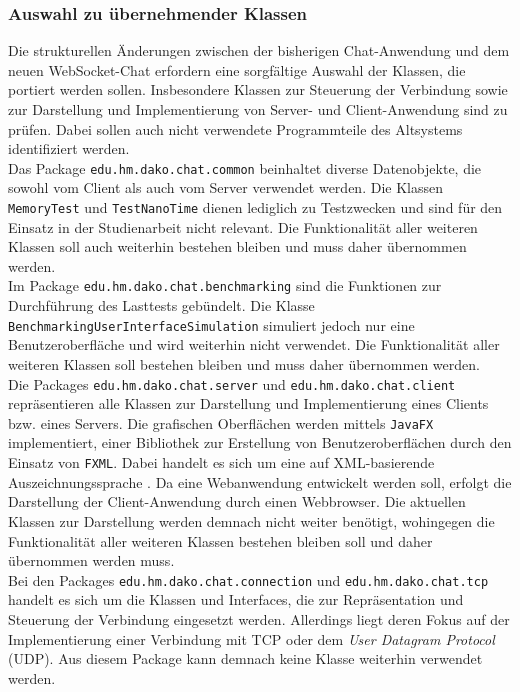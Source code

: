 \documentclass[11pt,a4paper,titlepage]{scrartcl}
\numberwithin{equation}{section}
\begin{document}
\subsubsection{Auswahl zu übernehmender Klassen }
Die strukturellen Änderungen zwischen der bisherigen Chat-Anwendung und dem neuen WebSocket-Chat erfordern eine sorgfältige Auswahl der Klassen, die portiert werden sollen. Insbesondere Klassen zur Steuerung der Verbindung sowie zur Darstellung und Implementierung von Server- und Client-Anwendung sind zu prüfen. Dabei sollen auch nicht verwendete Programmteile des Altsystems identifiziert werden.\\

\noindent Das Package \texttt{edu.hm.dako.chat.common} beinhaltet diverse Datenobjekte, die sowohl vom Client als auch vom Server verwendet werden. Die Klassen \texttt{MemoryTest} und \texttt{TestNanoTime} dienen lediglich zu Testzwecken und sind für den Einsatz in der Studienarbeit nicht relevant. Die Funktionalität aller weiteren Klassen soll auch weiterhin bestehen bleiben und muss daher übernommen werden. \\

\noindent Im Package \texttt{edu.hm.dako.chat.benchmarking} sind die Funktionen zur Durchführung des Lasttests gebündelt. Die Klasse \texttt{BenchmarkingUserInterfaceSimulation} simuliert jedoch nur eine Benutzeroberfläche und wird weiterhin nicht verwendet. Die Funktionalität aller weiteren Klassen soll bestehen bleiben und muss daher übernommen werden. \\

\noindent Die Packages \texttt{edu.hm.dako.chat.server} und \texttt{edu.hm.dako.chat.client} repräsentieren alle Klassen zur Darstellung und Implementierung eines Clients bzw. eines Servers. Die grafischen Oberflächen werden mittels \texttt{JavaFX} implementiert, einer Bibliothek zur Erstellung von Benutzeroberflächen durch den Einsatz von \texttt{FXML}. Dabei handelt es sich um eine auf XML-basierende Auszeichnungssprache \autocite{oracle_corporation_javafx_2014}. Da eine Webanwendung entwickelt werden soll, erfolgt die Darstellung der Client-Anwendung durch einen Webbrowser. Die aktuellen Klassen zur Darstellung werden demnach nicht weiter benötigt, wohingegen die Funktionalität aller weiteren Klassen bestehen bleiben soll und daher übernommen werden muss.\\

\noindent Bei den Packages \texttt{edu.hm.dako.chat.connection} und \texttt{edu.hm.dako.chat.tcp} handelt es sich um die Klassen und Interfaces, die zur Repräsentation und Steuerung der Verbindung eingesetzt werden. Allerdings liegt deren Fokus auf der Implementierung einer Verbindung mit TCP oder dem \textit{User Datagram Protocol} (UDP). Aus diesem Package kann demnach keine Klasse weiterhin verwendet werden.\\
\end{document}
